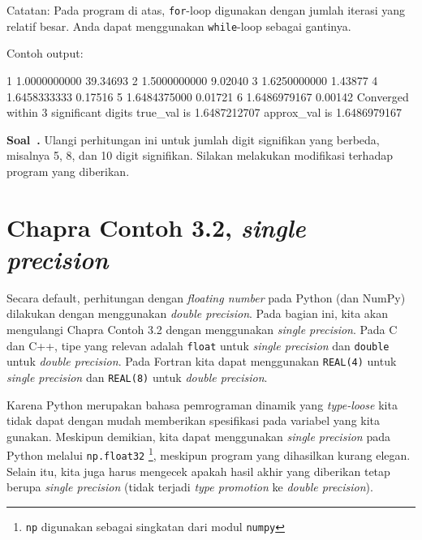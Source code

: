 \documentclass[a4paper,11pt,bahasa]{article} %
\newcommand{\txtinline}[1]{\texttt{#1}}
\newcommand{\pyinline}[1]{\texttt{#1}}
\newcounter{soal}%
\newenvironment{soal}[1][]{\refstepcounter{soal}\par\medskip
   \noindent \textbf{Soal~\thesoal. #1} \sffamily}{\medskip}
\begin{document}
Catatan: Pada program di atas, \pyinline{for}-loop digunakan dengan jumlah iterasi yang relatif
besar. Anda dapat menggunakan \pyinline{while}-loop sebagai gantinya.

Contoh output:
\begin{textcode}
  1       1.0000000000   39.34693%
  2       1.5000000000    9.02040%
  3       1.6250000000    1.43877%
  4       1.6458333333    0.17516%
  5       1.6484375000    0.01721%
  6       1.6486979167    0.00142%
Converged within 3 significant digits
true_val   is       1.6487212707
approx_val is       1.6486979167
\end{textcode}


\begin{soal}
Ulangi perhitungan ini untuk jumlah digit signifikan yang berbeda, misalnya 5, 8, dan 10
digit signifikan. Silakan melakukan modifikasi terhadap program yang diberikan.
\end{soal}

\section{Chapra Contoh 3.2, \textit{single precision}}
Secara default, perhitungan dengan \textit{floating number} pada Python (dan NumPy)
dilakukan dengan menggunakan \textit{double precision}. Pada bagian ini, kita akan
mengulangi Chapra Contoh 3.2 dengan menggunakan \textit{single precision}.
Pada C dan C++, tipe yang relevan adalah \txtinline{float}
untuk \textit{single precision} dan \txtinline{double} untuk \textit{double
precision}.
Pada Fortran kita dapat menggunakan \txtinline{REAL(4)} untuk \textit{single precision}
dan \txtinline{REAL(8)} untuk \textit{double precision}.

Karena Python merupakan bahasa pemrograman dinamik yang \textit{type-loose} kita tidak dapat
dengan mudah memberikan spesifikasi pada variabel yang kita gunakan. Meskipun demikian, 
kita dapat menggunakan \textit{single precision} pada Python melalui
\txtinline{np.float32}
\footnote{\txtinline{np} digunakan sebagai
singkatan dari modul \txtinline{numpy}},
meskipun program yang dihasilkan kurang elegan. Selain itu, kita juga harus mengecek
apakah hasil akhir yang diberikan tetap berupa \textit{single precision} (tidak terjadi
\textit{type promotion} ke \textit{double precision}).
\end{document}
